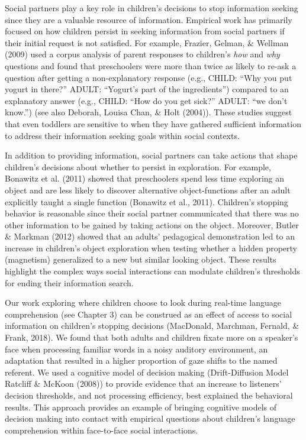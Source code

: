 \documentclass[oneside]{report}
\begin{document}
Social partners play a key role in children's decisions to stop
information seeking since they are a valuable resource of information.
Empirical work has primarily focused on how children persist in seeking
information from social partners if their initial request is not
satisfied. For example, Frazier, Gelman, \& Wellman (2009) used a corpus
analysis of parent responses to children's \emph{how} and \emph{why}
questions and found that preschoolers were more than twice as likely to
re-ask a question after getting a non-explanatory response (e.g., CHILD:
``Why you put yogurt in there?'' ADULT: ``Yogurt's part of the
ingredients'') compared to an explanatory answer (e.g., CHILD: ``How do
you get sick?'' ADULT: ``we don't know.'') (see also Deborah, Louisa
Chan, \& Holt (2004)). These studies suggest that even toddlers are
sensitive to when they have gathered sufficient information to address
their information seeking goals within social contexts.

In addition to providing information, social partners can take actions
that shape children's decisions about whether to persist in exploration.
For example, Bonawitz et al. (2011) showed that preschoolers spend less
time exploring an object and are less likely to discover alternative
object-functions after an adult explicitly taught a single function
(Bonawitz et al., 2011). Children's stopping behavior is reasonable
since their social partner communicated that there was no other
information to be gained by taking actions on the object. Moreover,
Butler \& Markman (2012) showed that an adults' pedagogical
demonstration led to an increase in children's object exploration when
testing whether a hidden property (magnetism) generalized to a new but
similar looking object. These results highlight the complex ways social
interactions can modulate children's thresholds for ending their
information search.

Our work exploring where children choose to look during real-time
language comprehension (see Chapter 3) can be construed as an effect of
access to social information on children's stopping decisions
(MacDonald, Marchman, Fernald, \& Frank, 2018). We found that both
adults and children fixate more on a speaker's face when processing
familiar words in a noisy auditory environment, an adaptation that
resulted in a higher proportion of gaze shifts to the named referent. We
used a cognitive model of decision making (Drift-Diffusion Model
Ratcliff \& McKoon (2008)) to provide evidence that an increase to
listeners' decision thresholds, and not processing efficiency, best
explained the behavioral results. This approach provides an example of
bringing cognitive models of decision making into contact with empirical
questions about children's language comprehension within face-to-face
social interactions.
\end{document}

